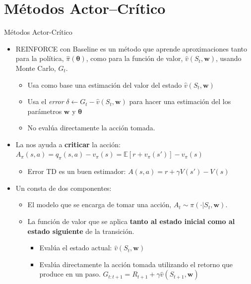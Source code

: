 \documentclass[10pt, envcountsect, handout, aspectratio=1610, hyperref={hypertexnames=true}]{beamer}
\begin{document}
\section{Métodos Actor–Crítico}



\begin{frame}{Métodos Actor-Crítico}
	\begin{itemize}
		\item REINFORCE con Baseline es un método que aprende aproximaciones tanto para la política, $\widehat{\pi}(\bm{\theta})$, como para la función de valor, $\widehat{v}(S_t, \mathbf{w})$, usando Monte Carlo, $G_t$.
		
			\begin{itemize}
				\item Usa como base una estimación del valor del estado $\widehat{v}(S_t, \mathbf{w})$
				\item Usa el \textit{error} $\delta \gets G_t-\widehat{v}(S_t, \mathbf{w})$ para hacer una estimación del los parámetros $\mathbf{w}$ y $\bm{\theta}$
				\item No evalúa directamente la acción tomada.
			\end{itemize}

		\item La  nos ayuda a \textbf{criticar} la acción: $A_\pi(s,a)=q_\pi(s,a)-v_\pi(s)=\mathbb{E}[r+v_\pi(s')] - v_\pi(s)$
		\begin{itemize}
			\item Error TD es un buen estimador: $A(s,a)=r+\gamma V(s')-V(s)$
		\end{itemize}
		
		\item Un  consta de dos componentes:
			\begin{itemize}
				\item {} El modelo que se encarga de tomar una acción, $A_t\sim\pi(\cdot|S_t,\bm{w})$.
				\item {} La función de valor que se aplica \textbf{tanto al estado inicial como al estado siguiente} de la transición.
					\begin{itemize}
						\item Evalúa el estado actual: $\widehat{v}(S_t, \mathbf{w})$ \hfill {}
						\item Evalúa directamente la acción tomada utilizando el retorno que produce en un paso.
						$G_{t:t+1}=R_{t+1} + \gamma  \widehat{v}(S_{t+1}, \mathbf{w})$
					\end{itemize}
			\end{itemize}
			

\end{itemize}
\end{frame}
\end{document}
